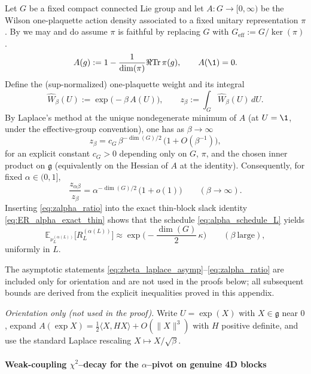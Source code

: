 \begin{remark}\label{rem:zbeta_scaling_G}
Let $G$ be a fixed compact connected Lie group and let $A:G\to[0,\infty)$ be the Wilson one-plaquette action density associated to a fixed unitary representation $\pi$.
By  we may and do assume $\pi$ is faithful by replacing $G$ with $G_{\mathrm{eff}}:=G/\ker(\pi)$.
\[
A(g):=1-\frac{1}{\dim(\pi)}\Re\mathrm{Tr}\,\pi(g),
\qquad A(\1)=0.
\]
Define the (sup-normalized) one-plaquette weight and its integral
\[
\widehat W_\beta(U):=\exp\big(-\beta\,A(U)\big),
\qquad
z_\beta:=\int_G \widehat W_\beta(U)\,dU.
\]
By Laplace's method at the unique nondegenerate minimum of $A$ (at $U=\1$, under the effective-group convention), one has as $\beta\to\infty$
\begin{equation}\label{eq:zbeta_laplace_asymp}
 z_\beta = c_G\,\beta^{-\dim(G)/2}\,\bigl(1+O(\beta^{-1})\bigr),
\end{equation}
for an explicit constant $c_G>0$ depending only on $G$, $\pi$, and the chosen inner product on $\mathfrak g$ (equivalently on the Hessian of $A$ at the identity).
Consequently, for fixed $\alpha\in(0,1]$,
\begin{equation}\label{eq:zalpha_ratio}
 \frac{z_{\alpha\beta}}{z_\beta} = \alpha^{-\dim(G)/2}\,\bigl(1+o(1)\bigr)\qquad (\beta\to\infty).
\end{equation}
Inserting \eqref{eq:zalpha_ratio} into the exact thin-block slack identity \eqref{eq:ER_alpha_exact_thin} shows that the schedule
\eqref{eq:alpha_schedule_L} yields
\[
\mathbb E_{\nu_L^{(\alpha(L))}}\!\big[R_L^{(\alpha(L))}\big]
\approx
\exp\!\Big(-\frac{\dim(G)}{2}\,\kappa\Big)
\qquad (\beta\ \text{large}),
\]
uniformly in $L$.

The asymptotic statements \eqref{eq:zbeta_laplace_asymp}--\eqref{eq:zalpha_ratio} are included only for orientation and are not used in the proofs below; all subsequent bounds are derived from the explicit inequalities proved in this appendix.

\smallskip
\noindent\emph{Orientation only (not used in the proof).} Write $U=\exp(X)$ with $X\in\mathfrak g$ near $0$, expand $A(\exp X)=\frac12\langle X, H X\rangle+O(\|X\|^3)$ with $H$ positive definite, and use the standard Laplace rescaling $X\mapsto X/\sqrt\beta$.
\end{remark}




\paragraph{Weak-coupling $\chi^2$--decay for the $\alpha$--pivot on genuine 4D blocks}\label{sec:chi2_decay_alpha}

